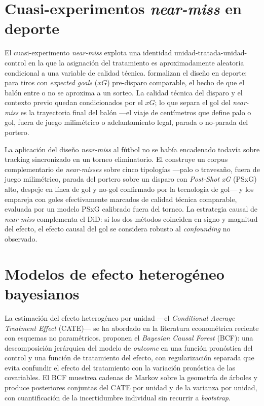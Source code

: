\section{Cuasi-experimentos \textit{near-miss} en deporte}
\label{sec:sota-nearmiss}

El cuasi-experimento \textit{near-miss} explota una identidad
unidad-tratada-unidad-control en la que la asignación del tratamiento
es aproximadamente aleatoria condicional a una variable de calidad
técnica. \textcite{GauriotPage2019} formalizan el diseño en deporte:
para tiros con \textit{expected goals} ($xG$) pre-disparo comparable,
el hecho de que el balón entre o no se aproxima a un sorteo. La
calidad técnica del disparo y el contexto previo quedan condicionados
por el $xG$; lo que separa el gol del \textit{near-miss} es la
trayectoria final del balón ---el viaje de centímetros que define
palo o gol, fuera de juego milimétrico o adelantamiento legal, parada
o no-parada del portero.

La aplicación del diseño \textit{near-miss} al fútbol no se había
encadenado todavía sobre tracking sincronizado en un torneo
eliminatorio. El \CCV construye un corpus complementario de
\textit{near-misses} sobre cinco tipologías ---palo o travesaño, fuera
de juego milimétrico, parada del portero sobre un disparo con
\textit{Post-Shot xG} (PSxG) alto, despeje en línea de gol y no-gol
confirmado por la tecnología de gol--- y los empareja con goles
efectivamente marcados de calidad técnica comparable, evaluada por un
modelo PSxG calibrado fuera del torneo. La estrategia causal de
\textit{near-miss} complementa el DiD: si los dos métodos coinciden
en signo y magnitud del efecto, el efecto causal del gol se considera
robusto al \textit{confounding} no observado.


\section{Modelos de efecto heterogéneo bayesianos}
\label{sec:sota-cate}

La estimación del efecto heterogéneo por unidad ---el
\textit{Conditional Average Treatment Effect} (CATE)--- se ha abordado
en la literatura econométrica reciente con esquemas no paramétricos.
\textcite{Hahn2020BCF} proponen el \textit{Bayesian Causal Forest}
(BCF): una descomposición jerárquica del modelo de \textit{outcome} en
una función pronóstica del control y una función de tratamiento del
efecto, con regularización separada que evita confundir el efecto del
tratamiento con la variación pronóstica de las covariables. El BCF
muestrea cadenas de Markov sobre la geometría de árboles y produce
posteriores conjuntas del CATE por unidad y de la varianza por unidad,
con cuantificación de la incertidumbre individual sin recurrir a
\textit{bootstrap}.

